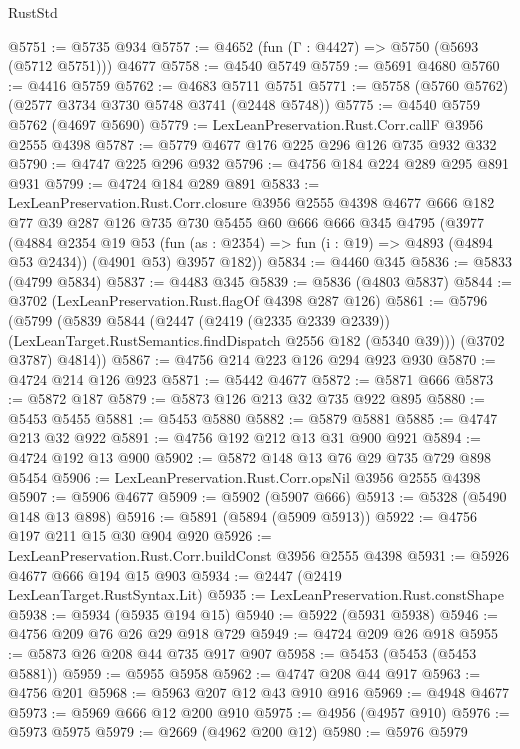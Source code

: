 \begin{lexlean}{RustStd}
\begin{coremodule}
@5751 := @5735 @934
@5757 := @4652 (fun (Γ : @4427) => @5750 (@5693 (@5712 @5751))) @4677
@5758 := @4540 @5749
@5759 := @5691 @4680
@5760 := @4416 @5759
@5762 := @4683 @5711 @5751
@5771 := @5758 (@5760 @5762) (@2577 @3734 @3730 @5748 @3741 (@2448 @5748))
@5775 := @4540 @5759 @5762 (@4697 @5690)
@5779 := LexLeanPreservation.Rust.Corr.callF @3956 @2555 @4398
@5787 := @5779 @4677 @176 @225 @296 @126 @735 @932 @332
@5790 := @4747 @225 @296 @932
@5796 := @4756 @184 @224 @289 @295 @891 @931
@5799 := @4724 @184 @289 @891
@5833 := LexLeanPreservation.Rust.Corr.closure
    @3956
    @2555
    @4398
    @4677
    @666
    @182
    @77
    @39
    @287
    @126
    @735
    @730
    @5455
    @60
    @666
    @666
    @345
    @4795
    (@3977
      (@4884
        @2354
        @19
        @53
        (fun (as : @2354) => fun (i : @19) => @4893 (@4894 @53 @2434))
        (@4901 @53)
        @3957
        @182))
@5834 := @4460 @345
@5836 := @5833 (@4799 @5834)
@5837 := @4483 @345
@5839 := @5836 (@4803 @5837)
@5844 := @3702 (LexLeanPreservation.Rust.flagOf @4398 @287 @126)
@5861 := @5796
    (@5799
      (@5839
        @5844
        (@2447
          (@2419 (@2335 @2339 @2339))
          (LexLeanTarget.RustSemantics.findDispatch @2556 @182 (@5340 @39)))
        (@3702 @3787)
        @4814))
@5867 := @4756 @214 @223 @126 @294 @923 @930
@5870 := @4724 @214 @126 @923
@5871 := @5442 @4677
@5872 := @5871 @666
@5873 := @5872 @187
@5879 := @5873 @126 @213 @32 @735 @922 @895
@5880 := @5453 @5455
@5881 := @5453 @5880
@5882 := @5879 @5881
@5885 := @4747 @213 @32 @922
@5891 := @4756 @192 @212 @13 @31 @900 @921
@5894 := @4724 @192 @13 @900
@5902 := @5872 @148 @13 @76 @29 @735 @729 @898 @5454
@5906 := LexLeanPreservation.Rust.Corr.opsNil @3956 @2555 @4398
@5907 := @5906 @4677
@5909 := @5902 (@5907 @666)
@5913 := @5328 (@5490 @148 @13 @898)
@5916 := @5891 (@5894 (@5909 @5913))
@5922 := @4756 @197 @211 @15 @30 @904 @920
@5926 := LexLeanPreservation.Rust.Corr.buildConst @3956 @2555 @4398
@5931 := @5926 @4677 @666 @194 @15 @903
@5934 := @2447 (@2419 LexLeanTarget.RustSyntax.Lit)
@5935 := LexLeanPreservation.Rust.constShape
@5938 := @5934 (@5935 @194 @15)
@5940 := @5922 (@5931 @5938)
@5946 := @4756 @209 @76 @26 @29 @918 @729
@5949 := @4724 @209 @26 @918
@5955 := @5873 @26 @208 @44 @735 @917 @907
@5958 := @5453 (@5453 (@5453 @5881))
@5959 := @5955 @5958
@5962 := @4747 @208 @44 @917
@5963 := @4756 @201
@5968 := @5963 @207 @12 @43 @910 @916
@5969 := @4948 @4677
@5973 := @5969 @666 @12 @200 @910
@5975 := @4956 (@4957 @910)
@5976 := @5973 @5975
@5979 := @2669 (@4962 @200 @12)
@5980 := @5976 @5979

\end{coremodule}
\end{lexlean}
